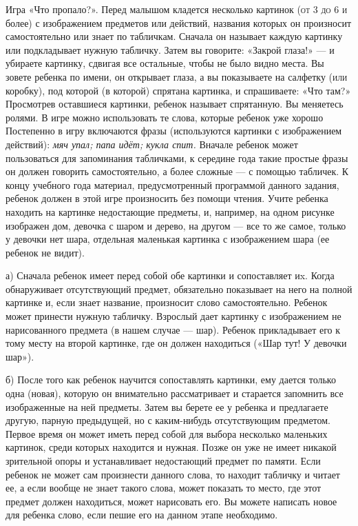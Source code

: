 \documentclass[a5paper]{book}
\renewcommand{\emph}[1]{\textit{#1}}
\begin{document}
Игра «Что пропало?». Перед малышом кладется несколько картинок
\textsc{(от} 3 \textsc{до} 6 \textsc{и} более) с изображением предметов
или действий, названия которых он произносит самостоятельно или знает по
табличкам. Сначала он называет каждую картинку или подкладывает нужную
табличку. Затем вы говорите: «Закрой глаза!» --- и убираете картинку,
сдвигая все остальные, чтобы не было видно места. Вы зовете ребенка по
имени, он открывает глаза, а вы показываете на салфетку \textsc{(или}
коробку), под которой (в которой) спрятана картинка, и спрашиваете: «Что
там?» Просмотрев оставшиеся картинки, ребенок называет спрятанную. Вы
меняетесь ролями. В игре можно использовать те слова, которые ребенок
уже хорошо Постепенно в игру включаются фразы (используются картинки с
изображением действий): \emph{мяч упал; папа идёт; кукла спит.} Вначале
ребенок может пользоваться для запоминания табличками, к середине года
такие простые фразы он должен говорить самостоятельно, а более сложные
--- с помощью табличек. К концу учебного года материал, предусмотренный
программой данного задания, ребенок должен в этой игре произносить без
помощи чтения. Учите ребенка находить на картинке недостающие предметы,
и, например, на одном рисунке изображен дом, девочка с шаром и дерево,
на другом --- все то же самое, только у девочки нет шара, отдельная
маленькая картинка с изображением шара (ее ребенок не видит).

а) Сначала ребенок имеет перед собой обе картинки и сопоставляет иx.
Когда обнаруживает отсутствующий предмет, обязательно показывает на него
на полной картинке и, если знает название, произносит слово
самостоятельно. Ребенок может принести нужную табличку. Взрослый дает
картинку с изображением не нарисованного предмета (в нашем случае ---
шар). Ребенок прикладывает его к тому месту на второй картинке, где он
должен находиться («Шар тут! У девочки шар»).

б) После того как ребенок научится сопоставлять картинки, ему дается
только одна (новая), которую он внимательно рассматривает и старается
запомнить все изображенные на ней предметы. Затем вы берете ее у ребенка
и предлагаете другую, парную предыдущей, но с каким-нибудь отсутствующим
предметом. Первое время он может иметь перед собой для выбора несколько
маленьких картинок, среди которых находится и нужная. Позже он уже не
имеет никакой зрительной опоры и устанавливает недостающий предмет по
памяти. Если ребенок не может сам произнести данного слова, то находит
табличку и читает ее, а если вообще не знает такого слова, может
показать то место, где этот предмет должен находиться, может нарисовать
его. Вы можете написать новое для ребенка слово, если пешие его на
данном этапе необходимо.
\end{document}
